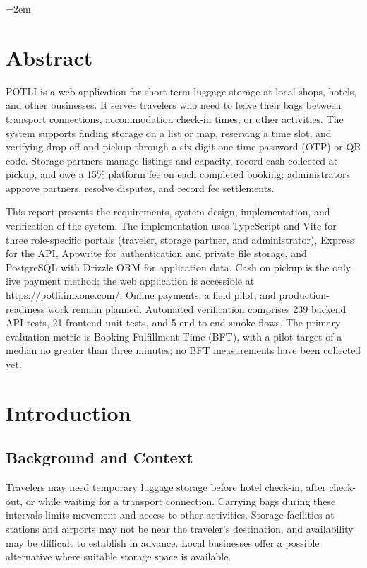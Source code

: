 \documentclass{tietreport}
\author{%
  \texttt{1024030088} Satyam Tiwari \\
  \texttt{1024030525} Ishant Mehndiratta \\
  \texttt{1024030494} Anshaj \\
  \texttt{1024030498} Aayush Bindal%
}
\begin{document}
\raggedbottom
\emergencystretch=2em
\hypersetup{pageanchor=false}
\maketitle

\hypersetup{pageanchor=true}
\chapter*{Abstract}
POTLI is a web application for short-term luggage storage at local shops, hotels, and other businesses. It serves travelers who need to leave their bags between transport connections, accommodation check-in times, or other activities. The system supports finding storage on a list or map, reserving a time slot, and verifying drop-off and pickup through a six-digit one-time password (OTP) or QR code. Storage partners manage listings and capacity, record cash collected at pickup, and owe a 15\% platform fee on each completed booking; administrators approve partners, resolve disputes, and record fee settlements.

This report presents the requirements, system design, implementation, and verification of the system. The implementation uses TypeScript and Vite for three role-specific portals (traveler, storage partner, and administrator), Express for the API, Appwrite for authentication and private file storage, and PostgreSQL with Drizzle ORM for application data. Cash on pickup is the only live payment method; the web application is accessible at \url{https://potli.imxone.com/}. Online payments, a field pilot, and production-readiness work remain planned. Automated verification comprises 239 backend API tests, 21 frontend unit tests, and 5 end-to-end smoke flows. The primary evaluation metric is Booking Fulfillment Time (BFT), with a pilot target of a median no greater than three minutes; no BFT measurements have been collected yet.

\tableofcontents
\listoffigures
\listoftables
\clearpage
{}

\chapter{Introduction}

\section{Background and Context}
Travelers may need temporary luggage storage before hotel check-in, after check-out, or while waiting for a transport connection. Carrying bags during these intervals limits movement and access to other activities. Storage facilities at stations and airports may not be near the traveler's destination, and availability may be difficult to establish in advance. Local businesses offer a possible alternative where suitable storage space is available.
\end{document}
